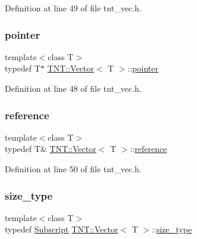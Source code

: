 Definition at line 49 of file tnt\+\_\+vec.\+h.

\mbox{\label{classTNT_1_1Vector_aacdf3935ca58837be7e80d21d8e17c6d}} 
\subsubsection{\texorpdfstring{pointer}{pointer}}
{\footnotesize\ttfamily template$<$class T$>$ \\
typedef T$\ast$ \hyperlink{classTNT_1_1Vector}{T\+N\+T\+::\+Vector}$<$ T $>$\+::\hyperlink{classTNT_1_1Vector_aacdf3935ca58837be7e80d21d8e17c6d}{pointer}}



Definition at line 48 of file tnt\+\_\+vec.\+h.

\mbox{\label{classTNT_1_1Vector_a9cdf62749080406bdf3fbace264dac85}} 
\subsubsection{\texorpdfstring{reference}{reference}}
{\footnotesize\ttfamily template$<$class T$>$ \\
typedef T\& \hyperlink{classTNT_1_1Vector}{T\+N\+T\+::\+Vector}$<$ T $>$\+::\hyperlink{classTNT_1_1Vector_a9cdf62749080406bdf3fbace264dac85}{reference}}



Definition at line 50 of file tnt\+\_\+vec.\+h.

\mbox{\label{classTNT_1_1Vector_adf52e96536358fcc4507fd08402aa07f}} 
\subsubsection{\texorpdfstring{size\+\_\+type}{size\_type}}
{\footnotesize\ttfamily template$<$class T$>$ \\
typedef \hyperlink{namespaceTNT_af22e3f1460e145c04ce4e7d701e4c1c1}{Subscript} \hyperlink{classTNT_1_1Vector}{T\+N\+T\+::\+Vector}$<$ T $>$\+::\hyperlink{classTNT_1_1Vector_adf52e96536358fcc4507fd08402aa07f}{size\+\_\+type}}



